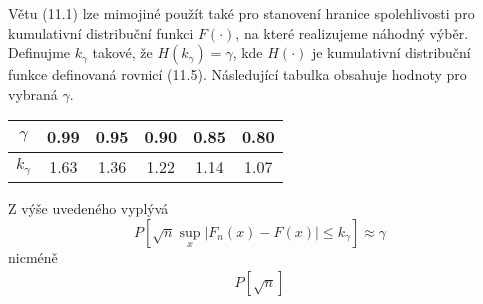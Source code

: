 Větu (11.1) lze mimojiné použít také pro stanovení hranice spolehlivosti pro kumulativní distribuční funkci $F(\cdot)$, na které realizujeme náhodný výběr. Definujme $k_{\gamma}$ takové, že $H(k_{\gamma}) = \gamma$, kde $H(\cdot)$ je kumulativní distribuční funkce definovaná rovnicí (11.5). Následující tabulka obsahuje hodnoty pro vybraná $\gamma$.
\begin{center}
  \begin{tabular}{|c|c c c c c|}
    \hline
    $\gamma$ & 0.99 & 0.95 & 0.90 & 0.85 & 0.80\\
    \hline
    $k_{\gamma}$ & 1.63 & 1.36 & 1.22 & 1.14 & 1.07\\
    \hline
  \end{tabular}
\end{center}
Z výše uvedeného vyplývá
\begin{equation*}
P[\sqrt{n} \sup_x|F_n(x) - F(x)| \le k_{\gamma}] \approx \gamma
\end{equation*}
nicméně
\begin{multline*}
P[\sqrt{n}]
\end{multline*}
